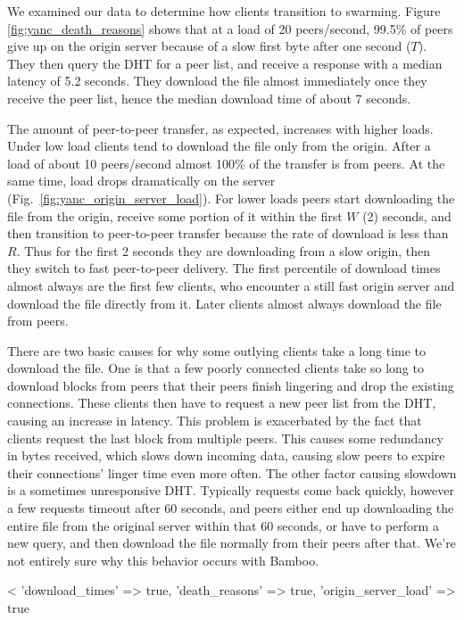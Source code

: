 We examined our data to determine how clients transition to swarming.  Figure \ref{fig:yanc_death_reasons} shows that at a load of 20 peers/second, 99.5\% 
of peers give up on the origin server because of a slow first byte after one second ($T$). They then query the 
DHT for a peer list, and receive a response with a median latency of 5.2 seconds.  They download the file almost 
immediately once they receive the peer list, hence the median download time of about 7 seconds. 

The amount of peer-to-peer transfer, as expected, increases with higher loads. Under low load clients tend to download 
the file only from the origin.  After a load of about 10 peers/second almost 100\% of the transfer is from 
peers.  At the same time, load drops dramatically on the server (Fig.~\ref{fig:yanc_origin_server_load}).  For lower loads peers start 
downloading the file from the origin, receive some portion of it within the first $W$ (2) seconds, and then
transition to peer-to-peer transfer because the rate of download is less than $R$.  
Thus for the first 2 seconds they are downloading from a slow origin, then they switch to fast peer-to-peer delivery.
The first percentile of download times almost always are the first few clients, who encounter a still fast origin server and download the file directly from it.
Later clients almost always download the file from peers.

There are two basic causes for why some outlying clients take a long time to download the file.  One is that a few poorly connected clients take so long to download blocks from peers
that their peers finish lingering and drop the existing connections.  These clients then have to request a new 
peer list from the DHT, causing an increase in latency.  This problem is exacerbated by the fact that clients request 
the last block from multiple peers.  This causes 
some redundancy in bytes received, which slows down incoming data, causing slow peers to expire their connections' linger time even more often.
The other factor causing slowdown is a sometimes unresponsive DHT. Typically requests come back quickly, however a few requests timeout after 60 seconds, 
and peers either end up downloading the entire file from the original server within that 60 seconds, or have to perform a new 
query, and then download the file normally from their peers after that.  We're not entirely sure why this behavior occurs with Bamboo.

<%
   {'download_times' => true, 'death_reasons' => true, 'origin_server_load' => true} %

